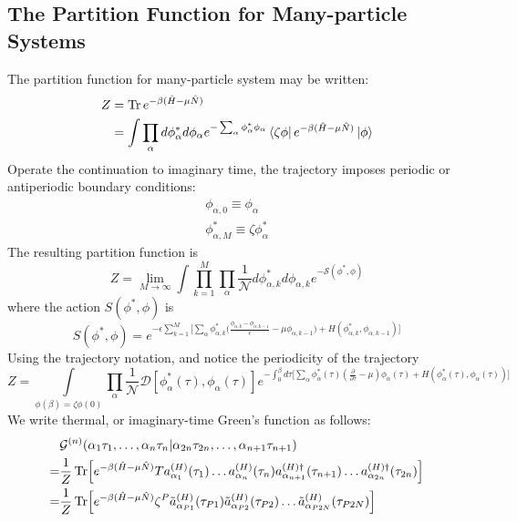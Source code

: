 \documentclass[12pt]{article}
\begin{document}
\subsection*{The Partition Function for Many-particle Systems}
The partition function for many-particle system may be written:
\begin{equation*}
    \begin{split}
        Z&=\Tr e^{-\beta(\hat{H}-\mu\hat{N})}\\
        &=\int\prod_\alpha d\phi^*_\alpha d\phi_\alpha e^{-\sum_\alpha\phi^*_\alpha
        \phi_\alpha}\bra{\zeta\phi}e^{-\beta(\hat{H}-\mu\hat{N})}\ket{\phi}
    \end{split}
\end{equation*}
Operate the continuation to imaginary time, the trajectory imposes periodic or 
antiperiodic boundary conditions:
\begin{equation*}
    \begin{split}
        \phi_{\alpha,0}\equiv\phi_\alpha\\
        \phi^*_{\alpha,M}\equiv\zeta\phi^*_\alpha
    \end{split}
\end{equation*}
The resulting partition function is
\begin{equation*}
    Z=\lim_{M\rightarrow\infty}\int\prod_{k=1}^M\prod_\alpha\frac{1}{\mathcal{N}}
    d\phi^*_{\alpha,k}d\phi_{\alpha,k}e^{-\mathcal{S}(\phi^*,\phi)}
\end{equation*}
where the action $S(\phi^*,\phi)$ is
\begin{equation*}
    S(\phi^*,\phi)=e^{-\epsilon\sum_{k=1}^M\big[\sum_\alpha\phi^*_{\alpha,k}
    \big(\frac{\phi_{\alpha,k}-\phi_{\alpha,k-1}}{\epsilon}-\mu\phi_{\alpha,k-1}
    \big)+H(\phi^*_{\alpha,k},\phi_{\alpha,k-1})\big]}
\end{equation*}
Using the trajectory notation, and notice the periodicity of the trajectory
\begin{equation*}
    Z=\int\limits_{\phi(\beta)=\zeta\phi(0)}\prod_\alpha\frac{1}{\mathcal{N}}
    \mathcal{D}[\phi_\alpha^*(\tau),\phi_\alpha(\tau)]e^{-\int_0^\beta d\tau
    \big[\sum_\alpha\phi_\alpha^*(\tau)(\frac{\partial}{\partial\tau}-\mu)
    \phi_\alpha(\tau)+H(\phi_\alpha^*(\tau),\phi_\alpha(\tau))\big]}
\end{equation*}
We write thermal, or imaginary-time Green's function as follows:
\begin{equation*}
    \begin{split}
        &\mathcal{G}^{(n)}(\alpha_1\tau_1,\dots,\alpha_n\tau_n|
        \alpha_{2n}\tau_{2n},\dots,\alpha_{n+1}\tau_{n+1})\\
        =&\frac{1}{Z}\Tr [e^{-\beta(\hat{H}-\mu\hat{N})}T
        a_{\alpha_1}^{(H)}(\tau_1)\dots a_{\alpha_n}^{(H)}(\tau_n)
        a_{\alpha_{n+1}}^{(H)\dagger}(\tau_{n+1})\dots a_{\alpha_{2n}}^{(H)\dagger}
        (\tau_{2n})]\\
        =&\frac{1}{Z}\Tr [e^{-\beta(\hat{H}-\mu\hat{N})}\zeta^P\tilde{a}^{(H)}
        _{\alpha_{P1}}(\tau_{P1})\tilde{a}^{(H)}_{\alpha_{P2}}(\tau_{P2})\dots
        \tilde{a}^{(H)}_{\alpha_{P2N}}(\tau_{P2N})]
    \end{split}
\end{equation*} 
\end{document}
